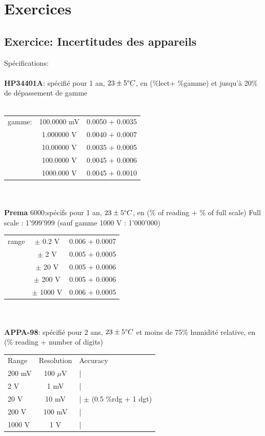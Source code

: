 \documentclass[main.tex]{subfiles}
\begin{document}
\iffalse

\pagebreak

\section{Exercices }

\subsection{Exercice: Incertitudes des appareils }
Spécifications:\\
\\
\textbf{HP34401A}: spécifié pour 1 an, $23 \pm 5 \degree C$, en (\%lect+ \%gamme) et jusqu'à 20\% de dépassement de gamme\\
\\
\begin{tabular}{l c c}
    \hline
    gamme: & 100.0000 mV & 0.0050 + 0.0035 \\
           & 1.000000 V  & 0.0040 + 0.0007 \\
           & 10.00000 V  & 0.0035 + 0.0005 \\
           & 100.0000 V  & 0.0045 + 0.0006 \\
           & 1000.000 V  & 0.0045 + 0.0010 \\
    \hline
\end{tabular}
\\
\\
\textbf{Prema} 6000:spécifs pour 1 an, $23 \pm 5 \degree C$, en (\% of reading + \% of full scale)
Full scale : 1'999'999 (sauf gamme 1000 V : 1'000'000)
\\
\begin{tabular}{lcc}
    \hline
    range & $\pm$ 0.2 V  & 0.006 + 0.0007 \\
          & $\pm$ 2 V    & 0.005 + 0.0005 \\
          & $\pm$ 20 V   & 0.005 + 0.0006 \\
          & $\pm$ 200 V  & 0.005 + 0.0006 \\
          & $\pm$ 1000 V & 0.006 + 0.0005 \\
    \hline
\end{tabular}
\\
\\
\textbf{APPA-98}: spécifié pour 2 ans, $23 \pm 5 \degree C$ et moins de 75\% humidité relative, en (\% reading + number of digits)
\\
\begin{tabular}{lcl}
    \hline
    Range  & Resolution & Accuracy                     \\
    200 mV & 100 $\mu$V & |                            \\
    2 V    & 1 mV       & |                            \\
    20 V   & 10 mV      & |  $\pm$ (0.5 \%rdg + 1 dgt) \\
    200 V  & 100 mV     & |                            \\
    1000 V & 1 V        & |                            \\
    \hline
\end{tabular}
\\
\end{document}
